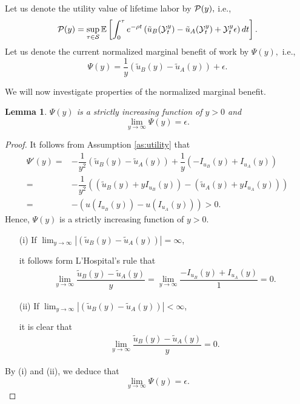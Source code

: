 \documentclass[a4paper,report, 11pt]{article}
\newtheorem{lem}{Lemma}[section]
\def\e{\epsilon}
\begin{document}
Let us denote the  utility value of lifetime labor by ${\cal P}(y),$ i.e., 
\begin{equation}\label{eq:OSP}
{\cal P}(y) = \sup_{\tau \in {\cal S}} \mathbb{E}\left[\int_0^\tau e^{-\rho t}\left(\tilde{u}_B({\cal Y}_t^y )-\tilde{u}_A({\cal Y}_t^y)+{\cal Y}_t^y \e\right)dt\right].
\end{equation}
Let us denote the current normalized marginal benefit of work  by $\Psi(y),$ i.e., 
\begin{equation*}
\Psi(y) = \dfrac{1}{y}\left(\tilde{u}_B(y)-\tilde{u}_A(y)\right)+\e. 
\end{equation*}


We will now investigate properties of the normalized marginal benefit.
\begin{lem}\label{lem:psi}
	$\Psi(y)$ is a strictly increasing function of $y>0$ and 
	\begin{equation*}
	\lim_{y\to \infty} \Psi(y) = \e. 
	\end{equation*}
\end{lem}
\begin{proof}
	It follows from Assumption \ref{as:utility} that 
	\begin{align*}
	\Psi'(y)=& -\dfrac{1}{y^2}\left(\tilde{u}_B(y)-\tilde{u}_A(y)\right)+\dfrac{1}{y}(-I_{u_B}(y)+I_{u_A}(y))\nonumber\\
	=&-\dfrac{1}{y^2}\left((\tilde{u}_B(y)+yI_{u_B}(y))-(\tilde{u}_A(y)+yI_{u_A}(y))\right)\\
	=&-\left(u(I_{u_B}(y))-u(I_{u_A}(y))\right)>0.\nonumber
	\end{align*}
	Hence, 	$\Psi(y)$ is a strictly increasing function of $y>0$.
	
	\begin{itemize}
		\item[(i)] If $\lim_{y\to \infty} |\left(\tilde{u}_B(y)-\tilde{u}_A(y)\right)|=\infty$,
		
		it follows form L'Hospital's rule that
		\begin{align*}
		\lim_{y\to \infty}\dfrac{\tilde{u}_B(y)-\tilde{u}_A(y)}{y}=\lim_{y\to\infty}\dfrac{-I_{u_B}(y)+I_{u_A}(y)}{1}=0. 
		\end{align*}
		
		\item[(ii)] If $\lim_{y\to \infty} |\left(\tilde{u}_B(y)-\tilde{u}_A(y)\right)|<\infty$, 
		
		it is clear that 
		\begin{align*}
		\lim_{y\to \infty}\dfrac{\tilde{u}_B(y)-\tilde{u}_A(y)}{y}=0. 
		\end{align*}
	\end{itemize}

By (i) and (ii), we deduce that 
$$
\lim_{y\to \infty}\Psi(y) = \e. 
$$
\end{proof}
\end{document}
